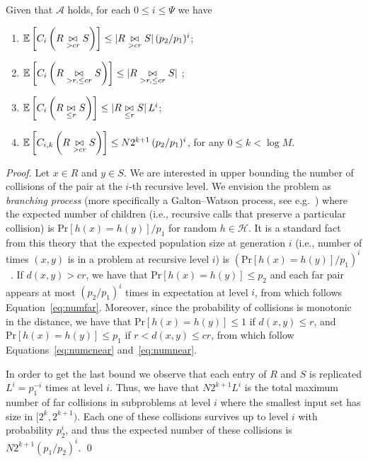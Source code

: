 \documentclass{llncs}
\newcommand{\E}[1]{\mathbb{E}\left[#1\right]}
\renewcommand{\Pr}[1]{\text{Pr}\left[#1\right]}
\begin{document}
\begin{lemma}\label{lemma:expectation}
Given that $\mathcal{A}$ holds, for each $0\leq i \leq \Psi$ we have

\begin{enumerate}
	\item $\E{\C{R \underset{> cr}{\bowtie} S}} \leq |R \underset{>
cr}{\bowtie} S|\, (p_2/p_1)^i$\label{eq:numfar};
	\item $\E{\C{R \underset{> r, \leq cr}{\bowtie} S}} \leq |R \underset{>r, \leq
cr}{\bowtie} S|$ \label{eq:numcnear};
	\item $\E{\C{R \underset{\leq r}{\bowtie} S}} \leq |R \underset{\leq
r}{\bowtie} S|\, L^i$\label{eq:numnear};
	\item $\E{\C[i,k]{R \underset{> cr}{\bowtie} S}} \leq N 2^{k+1}\,
(p_2/p_1)^i$, for any $0\leq k <\log M$\label{eq:numfarK}.
\end{enumerate}
\end{lemma}

\begin{proof}

Let $x\in R$ and $y\in S$. 
We are interested in upper bounding the number of collisions of the pair at the $i$-th recursive level. 
We envision the problem as \emph{branching process} (more specifically a Galton–Watson process, see e.g.~\cite{harris2002theory}) where the expected number of children (i.e., recursive calls that preserve a particular collision) is $\Pr{h(x)=h(y)}/p_1$ for random $h\in\mathcal{H}$. 
It is a standard fact from this theory that the expected population size at generation $i$ (i.e., number of times $(x,y)$ is in a problem at recursive level $i$) is $(\Pr{h(x)=h(y)}/p_1)^i$~\cite[Theorem 5.1]{harris2002theory}. 
If $d(x,y)>cr$, we have that $\Pr{h(x)=h(y)}\leq p_2$ and each far pair appears at most $(p_2/p_1)^i$ times in expectation at level $i$, from which follows Equation~\ref{eq:numfar}. 
Moreover, since the probability of collisions is monotonic in the distance, we have that  $\Pr{h(x)=h(y)}\leq 1$ if $d(x,y)\leq r$, and $\Pr{h(x)=h(y)}\leq p_1$ if $r<d(x,y)\leq cr$, from which follow Equations~\ref{eq:numcnear} and~\ref{eq:numnear}.

In order to get the last bound we observe that each entry of $R$ and $S$ is replicated $L^i=p_1^{-i}$ times at level $i$. 
Thus, we have that $N 2^{k+1} L^i$ is the total maximum number of far collisions in subproblems at level $i$ where the smallest input set has size in $[2^k, 2^{k+1})$. 
Each one of these collisions survives up to level $i$ with probability $p_2^i$, and thus the expected number of these collisions is $N 2^{k+1} (p_1/p_2)^i$. \qed

\end{proof}
\end{document}
